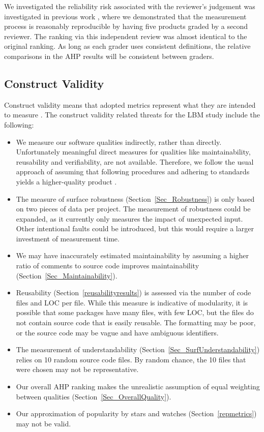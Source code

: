 \documentclass[final, 3p, times, authoryear]{elsarticle}
\begin{document}
We investigated the reliability risk associated with the reviewer's judgement was investigated in previous work
\citep{SmithEtAl2016}, %
where we demonstrated that the measurement process is
reasonably reproducible by having five products graded by a second reviewer. The
ranking via this independent review was almost identical to the original
ranking. As long as each grader uses consistent definitions, the relative
comparisons in the AHP results will be consistent between graders.

\subsection{Construct Validity}

Construct validity means that adopted metrics represent what they are intended
to measure \citep{RunesonAndHost2009}. The construct validity related threats
for the LBM study include the following:

\begin{itemize}
\item We measure our software qualities indirectly, rather than directly.
Unfortunately meaningful direct measures for qualities like maintainability,
reusability and verifiability, are not available.  Therefore, we follow the
usual approach of assuming that following procedures and adhering to standards
yields a higher-quality product \citep[p.\ 112]{VanVliet2000}.
\item The measure of surface robustness (Section~\ref{Sec_Robustness}) is only
based on two pieces of data per project. The measurement of robustness could be
expanded, as it currently only measures the impact of unexpected input. Other
intentional faults could be introduced, but this would require a larger
investment of measurement time. 
\item We may have inaccurately estimated maintainability by assuming a higher
ratio of comments to source code improves maintainability
(Section~\ref{Sec_Maintainability}). 
\item Reusability (Section~\ref{reusabilityresults}) is assessed via the number
of code files and LOC per file. While this measure is indicative of modularity,
it is possible that some packages have many files, with few LOC, but the files
do not contain source code that is easily reusable. The formatting may be poor,
or the source code may be vague and have ambiguous identifiers. 
\item The measurement of understandability
(Section~\ref{Sec_SurfUnderstandability}) relies on 10 random source code files.
By random chance, the 10 files that were chosen may not be representative. 
\item Our overall AHP ranking makes the unrealistic assumption of equal
weighting between qualities (Section~\ref{Sec_OverallQuality}).
\item Our approximation of popularity by stars and watches
(Section~\ref{repmetrics}) may not be valid. 
\end{itemize}
\end{document}
